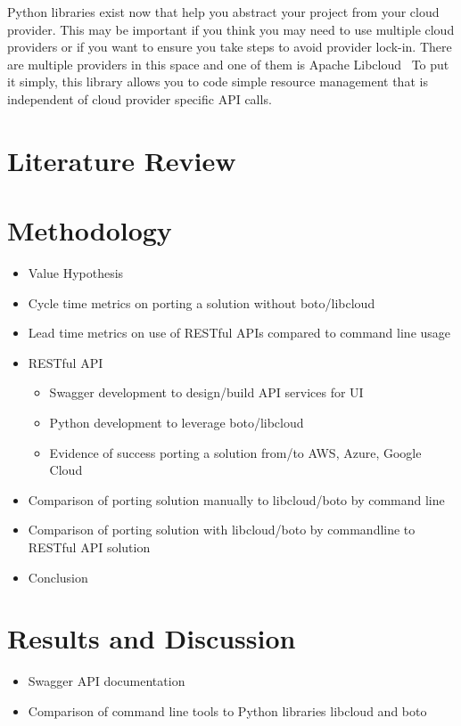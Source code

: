 Python libraries exist now that help you abstract your project from 
your cloud provider. This may be important if you think you may need 
to use multiple cloud providers or if you want to ensure you take 
steps to avoid provider lock-in. There are multiple providers in this 
space and one of them is Apache Libcloud~\cite{hid-sp18-518-LibCloud}
To put it simply, this library allows you to code simple resource 
management that is independent of cloud provider specific API calls.

\section{Literature Review}

\section{Methodology}

\begin{itemize}
\item
  Value Hypothesis
\item
  Cycle time metrics on porting a solution without boto/libcloud
\item
  Lead time metrics on use of RESTful APIs compared to command line
  usage
\item
  RESTful API

  \begin{itemize}
    \item
    Swagger development to design/build API services for UI
  \item
    Python development to leverage boto/libcloud
  \item
    Evidence of success porting a solution from/to AWS, Azure, Google
    Cloud
  \end{itemize}
\item
  Comparison of porting solution manually to libcloud/boto by command
  line
\item
  Comparison of porting solution with libcloud/boto by commandline to
  RESTful API solution
\item
  Conclusion
\end{itemize}

\section{Results and Discussion}

\begin{itemize}
\item
  Swagger API documentation
\item
  Comparison of command line tools to Python libraries libcloud and boto
\end{itemize}

